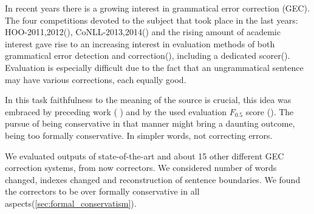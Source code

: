 \documentclass[english]{article}
\begin{document}


In recent years there is a growing interest in grammatical error correction (GEC). The four competitions devoted to the subject that took place in the last years: HOO-2011,2012(\cite{dale2011helping,dale2012hoo}), CoNLL-2013,2014(\cite{kao2013conll,ng2014conll}) and the rising amount of academic interest gave rise to an increasing interest in evaluation methods of both grammatical error detection and correction(\cite{tetreault2008native,madnani2011they,chodorow2012problems}), including a dedicated scorer(\cite{dahlmeier2012better}). Evaluation is especially difficult due to the fact that an ungrammatical sentence may have various corrections, each equally good.

In this task faithfulness to the meaning of the source is crucial, this idea was embraced by preceding work ( \cite{brockett2006correcting}) and by the used evaluation $F_{0.5}$ score (\cite{ng2014conll}). The pursue of being conservative in that manner might bring a daunting outcome, being too formally conservative. In simpler words, not correcting errors.

We evaluated outputs of state-of-the-art and about 15 other different GEC correction systems, from now correctors. We considered number of words changed, indexes changed and reconstruction of sentence boundaries. We found the correctors to be over formally conservative in all aspects(\ref{sec:formal_conservatism}).
\end{document}
